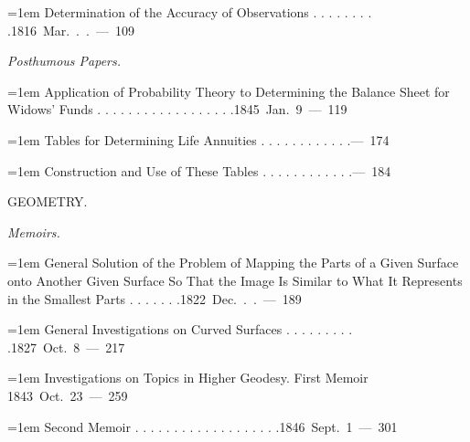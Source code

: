 \par\noindent\hangindent=1em Determination of the Accuracy of Observations . . . . . . . . .\hfill{}\hbox{}\nobreak\hfill\mbox{1816 Mar. . . — 109}\par
\par\medskip{}
\noindent\textit{Posthumous Papers.}\par
\par\noindent\hangindent=1em Application of Probability Theory to Determining the Balance Sheet for Widows’ Funds . . . . . . . . . . . . . . . . . .\hfill{}\hbox{}\nobreak\hfill\mbox{1845 Jan. 9 — 119}\par
\par\noindent\hangindent=1em Tables for Determining Life Annuities . . . . . . . . . . . .\hfill{}\hbox{}\nobreak\hfill\mbox{— 174}\par
\par\noindent\hangindent=1em Construction and Use of These Tables . . . . . . . . . . . .\hfill{}\hbox{}\nobreak\hfill\mbox{— 184}\par
\par\medskip{}
\begin{center}GEOMETRY.\end{center}
\par\medskip{}
\noindent\textit{Memoirs.}\par
\par\noindent\hangindent=1em General Solution of the Problem of Mapping the Parts of a Given Surface onto Another Given Surface So That the Image Is Similar to What It Represents in the Smallest Parts . . . . . . .\hfill{}\hbox{}\nobreak\hfill\mbox{1822 Dec. . . — 189}\par
\par\noindent\hangindent=1em General Investigations on Curved Surfaces . . . . . . . . . .\hfill{}\hbox{}\nobreak\hfill\mbox{1827 Oct. 8 — 217}\par
\par\noindent\hangindent=1em Investigations on Topics in Higher Geodesy. First Memoir \hfill{}\hbox{}\nobreak\hfill\mbox{1843 Oct. 23 — 259}\par
\par\noindent\hangindent=1em Second Memoir . . . . . . . . . . . . . . . . . . .\hfill{}\hbox{}\nobreak\hfill\mbox{1846 Sept. 1 — 301}\par
\endgroup
